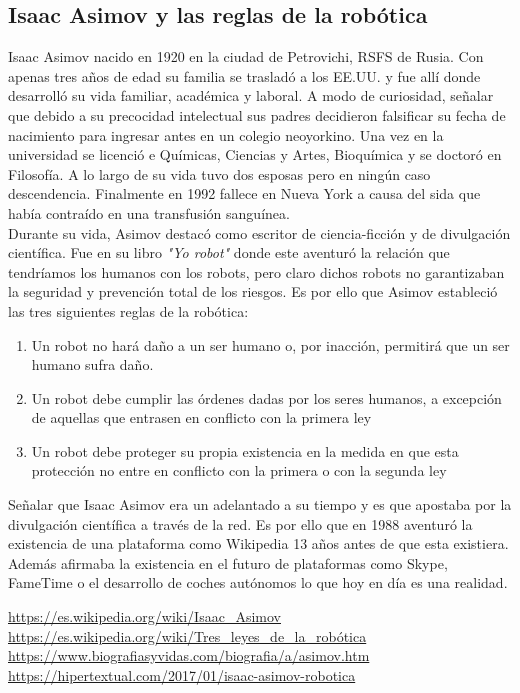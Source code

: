\documentclass[paper=a4, fontsize=11pt]{scrartcl}
\begin{document}
\subsection{Isaac Asimov y las reglas de la robótica}

Isaac Asimov nacido en 1920 en la ciudad de Petrovichi, RSFS de Rusia. Con apenas tres años de edad su familia se trasladó a los EE.UU. y fue allí donde desarrolló su vida familiar, académica y laboral. A modo de curiosidad, señalar que debido a su precocidad intelectual sus padres decidieron falsificar su fecha de nacimiento para ingresar antes en un colegio neoyorkino. Una vez en la universidad se licenció e Químicas, Ciencias y Artes, Bioquímica y se doctoró en Filosofía. A lo largo de su vida tuvo dos esposas pero en ningún caso descendencia. Finalmente en 1992 fallece en Nueva York a causa del sida que había contraído en una transfusión sanguínea.\\

Durante su vida, Asimov destacó como escritor de ciencia-ficción y de divulgación científica. Fue en su libro \textit{"Yo robot"} donde este aventuró la relación que tendríamos los humanos con los robots, pero claro dichos robots no garantizaban la seguridad y prevención total de los riesgos. Es por ello que Asimov estableció las tres siguientes reglas de la robótica:

\begin{enumerate}
\item Un robot no hará daño a un ser humano o, por inacción, permitirá que un ser humano sufra daño.
\item Un robot debe cumplir las órdenes dadas por los seres humanos, a excepción de aquellas que entrasen en conflicto con la primera ley
\item Un robot debe proteger su propia existencia en la medida en que esta protección no entre en conflicto con la primera o con la segunda ley
\end{enumerate}

Señalar que Isaac Asimov era un adelantado a su tiempo y es que apostaba por la divulgación científica a través de la red. Es por ello que en 1988 aventuró la existencia de una plataforma como Wikipedia 13 años antes de que esta existiera. Además afirmaba la existencia en el futuro de plataformas como Skype, FameTime o el desarrollo de coches autónomos lo que hoy en día es una realidad.

\url{https://es.wikipedia.org/wiki/Isaac\_Asimov}
\url{https://es.wikipedia.org/wiki/Tres\_leyes\_de\_la\_robótica}
\url{https://www.biografiasyvidas.com/biografia/a/asimov.htm}
\url{https://hipertextual.com/2017/01/isaac-asimov-robotica}
\end{document}

